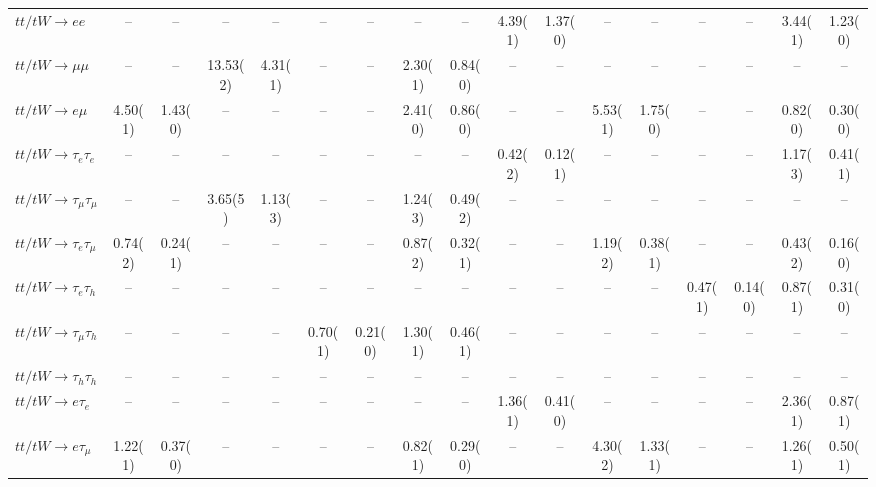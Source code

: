 \begin{sidewaystable}[p]
\begin{tabular}{|l|cc|cc|cc|cc|cc|cc|cc|cc|}
    $tt/tW \to ee$                     &    --    &    --    &    --    &    --    &    --    &    --    &    --    &    --    &  4.39(1) &  1.37(0) &    --    &    --    &    --    &    --    &  3.44(1) &  1.23(0) \\ 
    $tt/tW \to \mu\mu$                 &    --    &    --    & 13.53(2) &  4.31(1) &    --    &    --    &  2.30(1) &  0.84(0) &    --    &    --    &    --    &    --    &    --    &    --    &    --    &    --    \\ 
    $tt/tW \to e\mu$                   &  4.50(1) &  1.43(0) &    --    &    --    &    --    &    --    &  2.41(0) &  0.86(0) &    --    &    --    &  5.53(1) &  1.75(0) &    --    &    --    &  0.82(0) &  0.30(0) \\ 
    $tt/tW \to \tau_{e}\tau_{e}$       &    --    &    --    &    --    &    --    &    --    &    --    &    --    &    --    &  0.42(2) &  0.12(1) &    --    &    --    &    --    &    --    &  1.17(3) &  0.41(1) \\ 
    $tt/tW \to \tau_{\mu}\tau_{\mu}$   &    --    &    --    &  3.65(5) &  1.13(3) &    --    &    --    &  1.24(3) &  0.49(2) &    --    &    --    &    --    &    --    &    --    &    --    &    --    &    --    \\ 
    $tt/tW \to \tau_{e}\tau_{\mu}$     &  0.74(2) &  0.24(1) &    --    &    --    &    --    &    --    &  0.87(2) &  0.32(1) &    --    &    --    &  1.19(2) &  0.38(1) &    --    &    --    &  0.43(2) &  0.16(0) \\ 
    $tt/tW \to \tau_{e}\tau_{h}$       &    --    &    --    &    --    &    --    &    --    &    --    &    --    &    --    &    --    &    --    &    --    &    --    &  0.47(1) &  0.14(0) &  0.87(1) &  0.31(0) \\ 
    $tt/tW \to \tau_{\mu}\tau_{h}$     &    --    &    --    &    --    &    --    &  0.70(1) &  0.21(0) &  1.30(1) &  0.46(1) &    --    &    --    &    --    &    --    &    --    &    --    &    --    &    --    \\ 
    $tt/tW \to \tau_{h}\tau_{h}$       &    --    &    --    &    --    &    --    &    --    &    --    &    --    &    --    &    --    &    --    &    --    &    --    &    --    &    --    &    --    &    --    \\ 
    $tt/tW \to e\tau_{e}$              &    --    &    --    &    --    &    --    &    --    &    --    &    --    &    --    &  1.36(1) &  0.41(0) &    --    &    --    &    --    &    --    &  2.36(1) &  0.87(1) \\ 
    $tt/tW \to e\tau_{\mu}$            &  1.22(1) &  0.37(0) &    --    &    --    &    --    &    --    &  0.82(1) &  0.29(0) &    --    &    --    &  4.30(2) &  1.33(1) &    --    &    --    &  1.26(1) &  0.50(1) \\ 

\end{tabular}
\end{sidewaystable}
